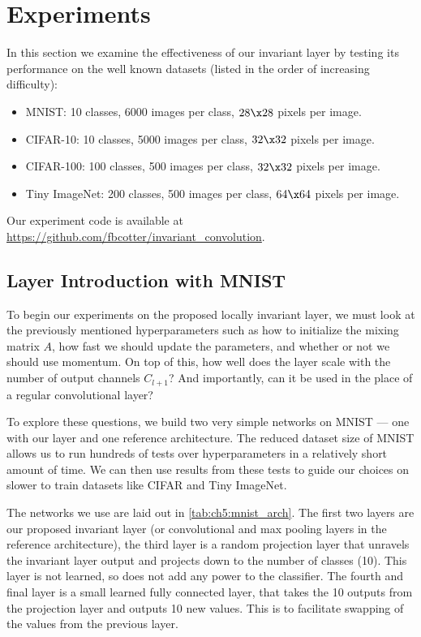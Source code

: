 \section{Experiments}\label{sec:experiments}
In this section we examine the effectiveness of our invariant layer by testing
its performance on the well known datasets (listed in the order of increasing
difficulty):
\begin{itemize}
  \item MNIST: 10 classes, 6000 images per class, $28\x 28$ pixels per image.
  \item CIFAR-10: 10 classes, 5000 images per class, $32\x 32$ pixels per image.
  \item CIFAR-100: 100 classes, 500 images per class, $32\x 32$ pixels per image. 
  \item Tiny ImageNet\cite{li_tiny_nodate}: 200 classes, 500 images per class, 
    $64 \x 64$ pixels per image. 
\end{itemize}
Our experiment code is available at
\url{https://github.com/fbcotter/invariant_convolution}.

\subsection{Layer Introduction with MNIST}\label{sec:ch5:mnist}
To begin our experiments on the proposed locally invariant layer, we must look at the
previously mentioned hyperparameters such as how to initialize the mixing matrix $A$, 
how fast we should update the parameters, and whether or not we should use
momentum. On top of this, how well does the layer scale with the number of
output channels $C_{l+1}$? And importantly, can it be used in the place of a
regular convolutional layer?

To explore these questions, we build two very simple networks on MNIST --- one with
our layer and one reference architecture. 
The reduced dataset size of MNIST allows us to run hundreds of tests over
hyperparameters in a relatively short amount of time. We can then use results
from these tests to guide our choices on slower to train datasets like CIFAR and
Tiny ImageNet.

The networks we use are laid out in \autoref{tab:ch5:mnist_arch}. The first
two layers are our proposed invariant layer (or convolutional and max pooling
layers in the reference architecture), the third layer is a random
projection layer that unravels the invariant layer output and projects
down to the number of classes (10). This layer is not learned, so does not add
any power to the classifier. The fourth and final layer is a small learned
fully connected layer, that takes the 10 outputs from the projection layer and
outputs 10 new values. This is to facilitate swapping of the values from the
previous layer. 


